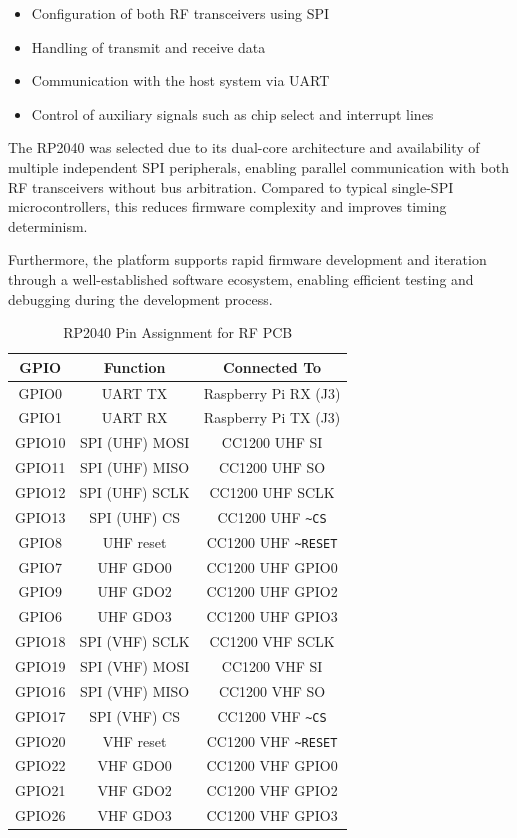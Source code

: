 \begin{itemize}
\item Configuration of both RF transceivers using SPI
\item Handling of transmit and receive data
\item Communication with the host system via UART
\item Control of auxiliary signals such as chip select and interrupt lines
\end{itemize}

The RP2040 was selected due to its dual-core architecture and availability of multiple independent SPI peripherals, enabling parallel communication with both RF transceivers without bus arbitration. Compared to typical single-SPI microcontrollers, this reduces firmware complexity and improves timing determinism.

Furthermore, the platform supports rapid firmware development and iteration through a well-established software ecosystem, enabling efficient testing and debugging during the development process.

\begin{table}[H]
\centering
\caption{RP2040 Pin Assignment for RF PCB}
\begin{tabular}{|c|c|c|}
\hline
\textbf{GPIO} & \textbf{Function} & \textbf{Connected To} \\
\hline
GPIO0  & UART TX & Raspberry Pi RX (J3) \\
GPIO1  & UART RX & Raspberry Pi TX (J3) \\
\hline
GPIO10 & SPI (UHF) MOSI & CC1200 UHF SI \\
GPIO11 & SPI (UHF) MISO & CC1200 UHF SO \\
GPIO12 & SPI (UHF) SCLK & CC1200 UHF SCLK \\
GPIO13 & SPI (UHF) CS   & CC1200 UHF \texttt{\textasciitilde CS} \\
GPIO8  & UHF reset      & CC1200 UHF \texttt{\textasciitilde RESET} \\
GPIO7  & UHF GDO0       & CC1200 UHF GPIO0 \\
GPIO9  & UHF GDO2       & CC1200 UHF GPIO2 \\
GPIO6  & UHF GDO3       & CC1200 UHF GPIO3 \\
\hline
GPIO18 & SPI (VHF) SCLK & CC1200 VHF SCLK \\
GPIO19 & SPI (VHF) MOSI & CC1200 VHF SI \\
GPIO16 & SPI (VHF) MISO & CC1200 VHF SO \\
GPIO17 & SPI (VHF) CS   & CC1200 VHF \texttt{\textasciitilde CS} \\
GPIO20 & VHF reset      & CC1200 VHF \texttt{\textasciitilde RESET} \\
GPIO22 & VHF GDO0       & CC1200 VHF GPIO0 \\
GPIO21 & VHF GDO2       & CC1200 VHF GPIO2 \\
GPIO26 & VHF GDO3       & CC1200 VHF GPIO3 \\
\hline
\end{tabular}
\label{tab:rp2040_pinout}
\end{table}


